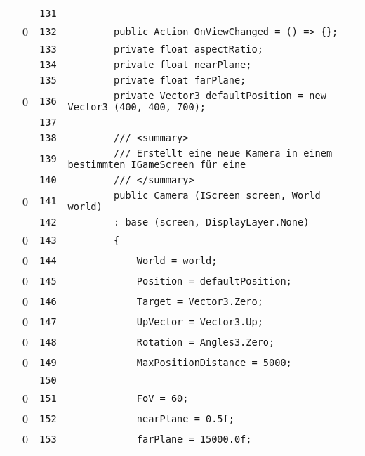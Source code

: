 \documentclass[a4paper,10pt]{article}
\begin{document}
\begin{longtable}[l]{lrrl}
\cellcolor{gray} &  & \verb~131~ & \verb~~\\
\cellcolor{red} & 0 & \verb~132~ & \verb~        public Action OnViewChanged = () => {};~\\
\cellcolor{gray} &  & \verb~133~ & \verb~        private float aspectRatio;~\\
\cellcolor{gray} &  & \verb~134~ & \verb~        private float nearPlane;~\\
\cellcolor{gray} &  & \verb~135~ & \verb~        private float farPlane;~\\
\cellcolor{red} & 0 & \verb~136~ & \verb~        private Vector3 defaultPosition = new Vector3 (400, 400, 700);~\\
\cellcolor{gray} &  & \verb~137~ & \verb~~\\
\cellcolor{gray} &  & \verb~138~ & \verb~        /// <summary>~\\
\cellcolor{gray} &  & \verb~139~ & \verb~        /// Erstellt eine neue Kamera in einem bestimmten IGameScreen für eine~\\
\cellcolor{gray} &  & \verb~140~ & \verb~        /// </summary>~\\
\cellcolor{red} & 0 & \verb~141~ & \verb~        public Camera (IScreen screen, World world)~\\
\cellcolor{gray} &  & \verb~142~ & \verb~        : base (screen, DisplayLayer.None)~\\
\cellcolor{red} & 0 & \verb~143~ & \verb~        {~\\
\cellcolor{red} & 0 & \verb~144~ & \verb~            World = world;~\\
\cellcolor{red} & 0 & \verb~145~ & \verb~            Position = defaultPosition;~\\
\cellcolor{red} & 0 & \verb~146~ & \verb~            Target = Vector3.Zero;~\\
\cellcolor{red} & 0 & \verb~147~ & \verb~            UpVector = Vector3.Up;~\\
\cellcolor{red} & 0 & \verb~148~ & \verb~            Rotation = Angles3.Zero;~\\
\cellcolor{red} & 0 & \verb~149~ & \verb~            MaxPositionDistance = 5000;~\\
\cellcolor{gray} &  & \verb~150~ & \verb~~\\
\cellcolor{red} & 0 & \verb~151~ & \verb~            FoV = 60;~\\
\cellcolor{red} & 0 & \verb~152~ & \verb~            nearPlane = 0.5f;~\\
\cellcolor{red} & 0 & \verb~153~ & \verb~            farPlane = 15000.0f;~\\

\end{longtable}
\end{document}
